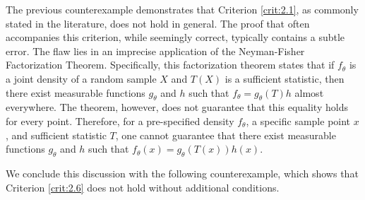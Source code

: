 \documentclass[12pt]{article}
\begin{document}
The previous counterexample demonstrates that Criterion \ref{crit:2.1}, as commonly stated in the literature, does not hold in general. The proof that often accompanies this criterion, while seemingly correct, typically contains a subtle error. The flaw lies in an imprecise application of the Neyman-Fisher Factorization Theorem. Specifically, this factorization theorem states that if $f_\theta $ is a joint density of a random sample $X$ and $T(X)$ is a sufficient statistic, then there exist measurable functions $g_\theta$ and $h$ such that $f_\theta =g_\theta (T)h$ almost everywhere. The theorem, however, does not guarantee that this equality holds for every point. Therefore, for a pre-specified density $f_\theta$, a specific sample point $x$, and sufficient statistic $T$, one cannot guarantee that there exist measurable functions $g_\theta$ and $h$ such that $f_\theta (x)=g_\theta (T(x))h(x)$.

We conclude this discussion with the following counterexample, which shows that Criterion \ref{crit:2.6} does not hold without additional conditions.
\end{document}
